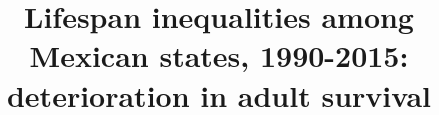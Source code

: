 \documentclass{bmcart}
\begin{document}
\begin{frontmatter}

\begin{fmbox}


\title{Lifespan inequalities among Mexican states, 1990-2015: deterioration in adult survival}



\author[
   addressref={aff1},                   %
   corref={aff1},     
   noteref={n1},                  %
   email={jmaburto@health.sdu.dk}   %
]{ }
\author[
   addressref={aff2},
   noteref={n1},
   email={riffe@demogr.mpg.de}
]{ }
\author[
   addressref={aff1},                   %
   email={vcanudas@health.sdu.dk}
]{ }



\end{fmbox}
\end{frontmatter}
\end{document}
